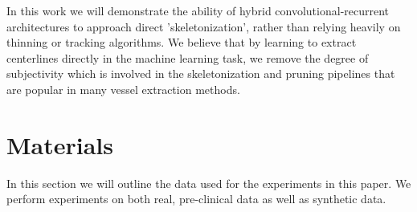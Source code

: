 \documentclass[journal,transmag]{IEEEtran}
\begin{document}
In this work we will demonstrate the ability of hybrid convolutional-recurrent architectures to approach direct 'skeletonization', rather than relying heavily on thinning or tracking algorithms. We believe that by learning to extract centerlines directly in the machine learning task, we remove the degree of subjectivity which is involved in the skeletonization and pruning pipelines that are popular in many vessel extraction methods. 

\section{Materials}

In this section we will outline the data used for the experiments in this paper. We perform experiments on both real, pre-clinical data as well as synthetic data.
\end{document}
